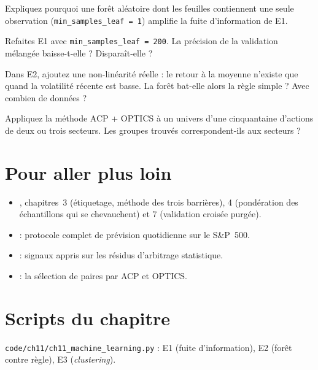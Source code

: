 \begin{exercise}
Expliquez pourquoi une forêt aléatoire dont les feuilles contiennent une seule observation (\texttt{min\_samples\_leaf = 1}) amplifie la fuite d'information de E1.
\end{exercise}

\begin{exercise}[à coder]
Refaites E1 avec \texttt{min\_samples\_leaf = 200}. La précision de la validation mélangée baisse-t-elle ? Disparaît-elle ?
\end{exercise}

\begin{exercise}[à coder]
Dans E2, ajoutez une non-linéarité réelle : le retour à la moyenne n'existe que quand la volatilité récente est basse. La forêt bat-elle alors la règle simple ? Avec combien de données ?
\end{exercise}

\begin{exercise}
Appliquez la méthode ACP + OPTICS à un univers d'une cinquantaine d'actions de deux ou trois secteurs. Les groupes trouvés correspondent-ils aux secteurs ?
\end{exercise}

\section{Pour aller plus loin}

\begin{toread}
\begin{itemize}[leftmargin=1.2em]
\item \citet{lopezdeprado2018}, chapitres~3 (étiquetage, méthode des trois barrières), 4 (pondération des échantillons qui se chevauchent) et 7 (validation croisée purgée).
\item \citet{krauss2017ml} : protocole complet de prévision quotidienne sur le S\&P~500.
\item \citet{guijarro2021} : signaux appris sur les résidus d'arbitrage statistique.
\item \citet{sarmento2020} : la sélection de paires par ACP et OPTICS.
\end{itemize}
\end{toread}

\section{Scripts du chapitre}
\noindent\texttt{code/ch11/ch11\_machine\_learning.py} : E1 (fuite d'information), E2 (forêt contre règle), E3 (\emph{clustering}).
